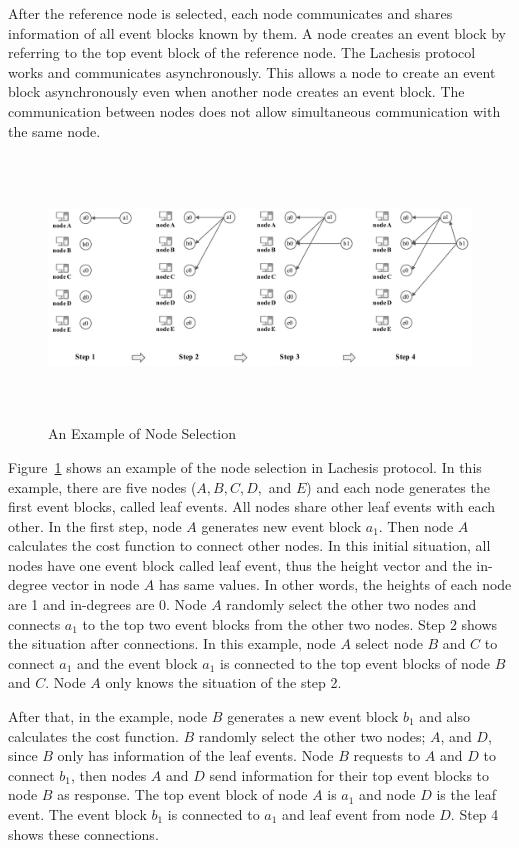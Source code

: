 \documentclass{article}
\begin{document}
After the reference node is selected, each node communicates and shares information of all event blocks known by them. A node creates an event block by referring to the top event block of the reference node. The Lachesis protocol works and communicates asynchronously. This allows a node to create an event block asynchronously even when another node creates an event block. The communication between nodes does not allow simultaneous communication with the same node. 

\begin{figure}[H] \centering  
\includegraphics[height=7cm, width=1.0\columnwidth]{node_selection.pdf}
\caption{An Example of Node Selection}
\label{fig:node_selection}
\end{figure}

Figure~\ref{fig:node_selection} shows an example of the node selection in Lachesis protocol. In this example, there are five nodes ($A, B, C, D,$ and $E$) and each node generates the first event blocks, called leaf events. All nodes share other leaf events with each other. In the first step, node $A$ generates new event block $a_1$. Then node $A$ calculates the cost function to connect other nodes. In this initial situation, all nodes have one event block called leaf event, thus the height vector and the in-degree vector in node $A$ has same values. In other words, the heights of each node are 1 and in-degrees are 0. Node $A$ randomly select the other two nodes and connects $a_1$ to the top two event blocks from the other two nodes. Step 2 shows the situation after connections. In this example, node $A$ select node $B$ and $C$ to connect $a_1$ and the event block $a_1$ is connected to the top event blocks of node $B$ and $C$. Node $A$ only knows the situation of the step 2. 

After that, in the example, node $B$ generates a new event block $b_1$ and also calculates the cost function. $B$ randomly select the other two nodes; $A$, and $D$, since $B$ only has information of the leaf events. Node $B$ requests to $A$ and $D$ to connect $b_1$, then nodes $A$ and $D$ send information for their top event blocks to node $B$ as response. The top event block of node $A$ is $a_1$ and node $D$ is the leaf event. The event block $b_1$ is connected to $a_1$ and leaf event from node $D$. Step 4 shows these connections. 
\end{document}
